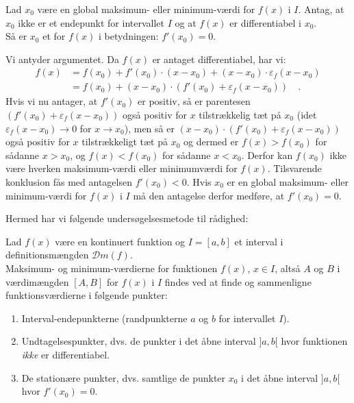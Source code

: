 \begin{lemma}
Lad $x_{0}$ være en global maksimum- eller minimum-værdi for $f(x)$ i $I$. Antag, at  $x_{0}$ ikke er et endepunkt for intervallet $I$ og at $f(x)$ er differentiabel i $x_{0}$.\\
 Så er
$x_{0}$ et  for $f(x)$ i betydningen: $f'(x_{0}) = 0$.
\end{lemma}
\begin{bevis}
Vi antyder argumentet. Da $f(x)$ er antaget differentiabel, har vi:
\begin{equation}
\begin{aligned}
f(x) &= f(x_{0}) + f'(x_{0})\cdot(x-x_{0}) + (x-x_{0}) \cdot \varepsilon_{f}(x-x_{0}) \\
&= f(x_{0}) + (x- x_{0})\cdot(f'(x_{0}) + \varepsilon_{f}(x-x_{0})) \quad.
\end{aligned}
\end{equation}
Hvis vi nu antager, at $f'(x_{0})$ er positiv, så er parentesen $(f'(x_{0}) + \varepsilon_{f}(x-x_{0}))$ også positiv for $x$ tilstrækkelig tæt på $x_{0}$ (idet  $\varepsilon_{f}(x-x_{0}) \to 0$ for $x \to x_{0}$), men så er $(x- x_{0})\cdot(f'(x_{0}) + \varepsilon_{f}(x-x_{0}))$ også positiv for $x$ tilstrækkeligt tæt på $x_{0}$ og dermed er
$f(x) > f(x_{0})$ for sådanne $x > x_{0}$, og $f(x) < f(x_{0})$ for sådanne $x < x_{0}$. Derfor kan $f(x_{0})$ ikke være hverken maksimum-værdi eller minimumværdi for $f(x)$. Tilsvarende konklusion fås med antagelsen $f'(x_{0}) < 0 $. Hvis $x_{0}$ er en global maksimum- eller minimum-værdi for $f(x)$ i $I$ må den antagelse derfor medføre, at $f'(x_{0}) = 0$.
\end{bevis}

Hermed har vi følgende undersøgelsesmetode til rådighed:

\begin{method}[Undersøgelsesmetode]\label{metodeVm}
Lad $f(x)$ være en kontinuert funktion og $I = [a, b]$ et interval i definitionsmængden $\mathcal{D}m(f)$.\\

Maksimum- og minimum-værdierne for funktionen $f(x)$, $x \in I$, altså $A$ og $B$ i værdimængden $[A, B]$ for $f(x)$ i $I$  findes ved at finde og sammenligne funktionsværdierne i følgende punkter:
\begin{enumerate}
\item Interval-endepunkterne (randpunkterne $a$ og $b$ for intervallet $I$).
\item Undtagelsespunkter, dvs. de punkter i det åbne interval $]a, b[$ hvor funktionen {\emph{ikke}} er differentiabel.
\item De stationære punkter, dvs. samtlige de punkter $x_{0}$ i det åbne interval $]a, b[$  hvor $f'(x_{0}) = 0$.
\end{enumerate}
\end{method}

